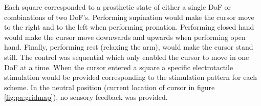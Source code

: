 Each square corresponded to a prosthetic state of either a single DoF or combinations of two DoF's. Performing supination would make the cursor move to the right and to the left when performing pronation. Performing closed hand would make the cursor move downwards and upwards when performing open hand. Finally, performing rest (relaxing the arm), would make the cursor stand still. The control was sequential which only enabled the cursor to move in one DoF at a time. When the cursor entered a square a specific electrotactile stimulation would be provided corresponding to the stimulation pattern for each scheme. In the neutral position (current location of cursor in figure \ref{fig:pa:gridmap}), no sensory feedback was provided.     

